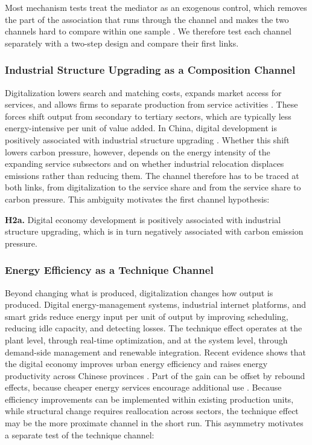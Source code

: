 \documentclass[economies,article,submit,moreauthors]{Definitions/mdpi}
\begin{document}
Most mechanism tests treat the mediator as an exogenous control, which removes the part of the association that runs through the channel and makes the two channels hard to compare within one sample \citep{imai2010,bullock2010}. We therefore test each channel separately with a two-step design and compare their first links.

\subsubsection{Industrial Structure Upgrading as a Composition Channel}

Digitalization lowers search and matching costs, expands market access for services, and allows firms to separate production from service activities \citep{goldfarb2019}. These forces shift output from secondary to tertiary sectors, which are typically less energy-intensive per unit of value added. In China, digital development is positively associated with industrial structure upgrading \citep{huangwu2024,zhang2025}. Whether this shift lowers carbon pressure, however, depends on the energy intensity of the expanding service subsectors and on whether industrial relocation displaces emissions rather than reducing them. The channel therefore has to be traced at both links, from digitalization to the service share and from the service share to carbon pressure. This ambiguity motivates the first channel hypothesis:

\textbf{H2a.} Digital economy development is positively associated with industrial structure upgrading, which is in turn negatively associated with carbon emission pressure.

\subsubsection{Energy Efficiency as a Technique Channel}

Beyond changing what is produced, digitalization changes how output is produced. Digital energy-management systems, industrial internet platforms, and smart grids reduce energy input per unit of output by improving scheduling, reducing idle capacity, and detecting losses. The technique effect operates at the plant level, through real-time optimization, and at the system level, through demand-side management and renewable integration. Recent evidence shows that the digital economy improves urban energy efficiency \citep{ma2024} and raises energy productivity across Chinese provinces \citep{wang2025energy}. Part of the gain can be offset by rebound effects, because cheaper energy services encourage additional use \citep{gillingham2016}. Because efficiency improvements can be implemented within existing production units, while structural change requires reallocation across sectors, the technique effect may be the more proximate channel in the short run. This asymmetry motivates a separate test of the technique channel:
\end{document}
